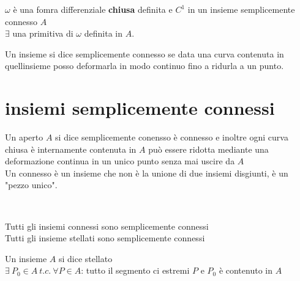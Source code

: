 \documentclass[a4paper, oneside]{article}
\newcommand{\tab}{\hspace*{2em}}
\begin{document}
\begin{theorem}
     $\omega$ è una fomra differenziale \textbf{chiusa} definita e $C^1$ in un insieme semplicemente connesso $A$\\
     $\exists$ una primitiva di $\omega$ definita in $A$.
\end{theorem}


\begin{observation}
    Un insieme si dice semplicemente connesso se data una curva contenuta in quellinsieme posso deformarla in modo continuo fino a ridurla a un punto.
\end{observation}


\section{insiemi semplicemente connessi}
\begin{definition}
    Un aperto $A$ si dice semplicemente conensso  è connesso e inoltre ogni curva chiusa è internamente contenuta in $A$ può essere ridotta mediante una deformazione continua in un unico punto senza mai uscire da $A$\\
    Un connesso è un insieme che non è la unione di due insiemi disgiunti, è un "pezzo unico".\\
\end{definition}
\hfill\\


\begin{aside}
    Tutti gli insiemi connessi sono semplicemente connessi\\
    Tutti gli insieme stellati sono semplicemente connessi
\end{aside}


\begin{definition}
    Un insieme $A$ si dice stellato\\
     $\exists \ P_0 \in A \ t.c. \ \forall P \in A$: \tab tutto il segmento ci estremi $P$ e $P_0$ è contenuto in $A$
\end{definition}
\hfill\\
\end{document}
